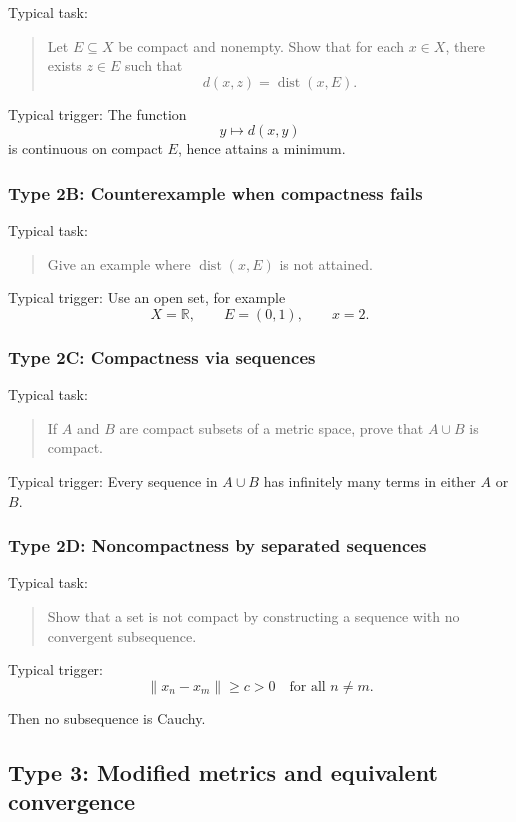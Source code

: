 Typical task:
\begin{quote}
    Let $E\subseteq X$ be compact and nonempty. Show that for each $x\in X$, there exists $z\in E$ such that
    \[
        d(x,z)=\operatorname{dist}(x,E).
    \]
\end{quote}

Typical trigger: The function
\[
    y\mapsto d(x,y)
\]
is continuous on compact $E$, hence attains a minimum.

\subsubsection*{Type 2B: Counterexample when compactness fails}

Typical task:
\begin{quote}
    Give an example where $\operatorname{dist}(x,E)$ is not attained.
\end{quote}

Typical trigger: Use an open set, for example
\[
    X=\mathbb R,\qquad E=(0,1),\qquad x=2.
\]

\subsubsection*{Type 2C: Compactness via sequences}

Typical task:
\begin{quote}
    If $A$ and $B$ are compact subsets of a metric space, prove that $A\cup B$ is compact.
\end{quote}

Typical trigger: Every sequence in $A\cup B$ has infinitely many terms in either $A$ or $B$.

\subsubsection*{Type 2D: Noncompactness by separated sequences}

Typical task:
\begin{quote}
    Show that a set is not compact by constructing a sequence with no convergent subsequence.
\end{quote}

Typical trigger:
\[
    \|x_n-x_m\|\geq c>0 \quad \text{for all } n\neq m.
\]

Then no subsequence is Cauchy.

\subsection{Type 3: Modified metrics and equivalent convergence}

